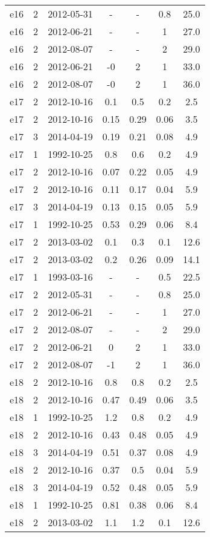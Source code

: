 \begin{longtable}{ccccccc}
e16 & 2 & 2012-05-31 & - & - & 0.8 & 25.0 \\
e16 & 2 & 2012-06-21 & - & - & 1 & 27.0 \\
e16 & 2 & 2012-08-07 & - & - & 2 & 29.0 \\
e16 & 2 & 2012-06-21 & -0 & 2 & 1 & 33.0 \\
e16 & 2 & 2012-08-07 & -0 & 2 & 1 & 36.0 \\
e17 & 2 & 2012-10-16 & 0.1 & 0.5 & 0.2 & 2.5 \\
e17 & 2 & 2012-10-16 & 0.15 & 0.29 & 0.06 & 3.5 \\
e17 & 3 & 2014-04-19 & 0.19 & 0.21 & 0.08 & 4.9 \\
e17 & 1 & 1992-10-25 & 0.8 & 0.6 & 0.2 & 4.9 \\
e17 & 2 & 2012-10-16 & 0.07 & 0.22 & 0.05 & 4.9 \\
e17 & 2 & 2012-10-16 & 0.11 & 0.17 & 0.04 & 5.9 \\
e17 & 3 & 2014-04-19 & 0.13 & 0.15 & 0.05 & 5.9 \\
e17 & 1 & 1992-10-25 & 0.53 & 0.29 & 0.06 & 8.4 \\
e17 & 2 & 2013-03-02 & 0.1 & 0.3 & 0.1 & 12.6 \\
e17 & 2 & 2013-03-02 & 0.2 & 0.26 & 0.09 & 14.1 \\
e17 & 1 & 1993-03-16 & - & - & 0.5 & 22.5 \\
e17 & 2 & 2012-05-31 & - & - & 0.8 & 25.0 \\
e17 & 2 & 2012-06-21 & - & - & 1 & 27.0 \\
e17 & 2 & 2012-08-07 & - & - & 2 & 29.0 \\
e17 & 2 & 2012-06-21 & 0 & 2 & 1 & 33.0 \\
e17 & 2 & 2012-08-07 & -1 & 2 & 1 & 36.0 \\
e18 & 2 & 2012-10-16 & 0.8 & 0.8 & 0.2 & 2.5 \\
e18 & 2 & 2012-10-16 & 0.47 & 0.49 & 0.06 & 3.5 \\
e18 & 1 & 1992-10-25 & 1.2 & 0.8 & 0.2 & 4.9 \\
e18 & 2 & 2012-10-16 & 0.43 & 0.48 & 0.05 & 4.9 \\
e18 & 3 & 2014-04-19 & 0.51 & 0.37 & 0.08 & 4.9 \\
e18 & 2 & 2012-10-16 & 0.37 & 0.5 & 0.04 & 5.9 \\
e18 & 3 & 2014-04-19 & 0.52 & 0.48 & 0.05 & 5.9 \\
e18 & 1 & 1992-10-25 & 0.81 & 0.38 & 0.06 & 8.4 \\
e18 & 2 & 2013-03-02 & 1.1 & 1.2 & 0.1 & 12.6 \\

\end{longtable}
